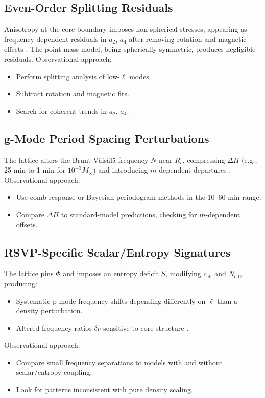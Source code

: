 \documentclass{article}
\begin{document}
\subsection{Even-Order Splitting Residuals}

Anisotropy at the core boundary imposes non-spherical stresses, appearing as frequency-dependent residuals in $a_2$, $a_4$ after removing rotation and magnetic effects \citep{lund2017}. The point-mass model, being spherically symmetric, produces negligible residuals. Observational approach:
\begin{itemize}
\item Perform splitting analysis of low-$\ell$ modes.
\item Subtract rotation and magnetic fits.
\item Search for coherent trends in $a_2$, $a_4$.
\end{itemize}

\subsection{g-Mode Period Spacing Perturbations}

The lattice alters the Brunt-Väisälä frequency $N$ near $R_c$, compressing $\Delta \Pi$ (e.g., 25 min to 1 min for $10^{-3} M_\odot$) and introducing $m$-dependent departures \citep{bellinger2025}. Observational approach:
\begin{itemize}
\item Use comb-response or Bayesian periodogram methods in the 10--60 min range.
\item Compare $\Delta \Pi$ to standard-model predictions, checking for $m$-dependent offsets.
\end{itemize}

\subsection{RSVP-Specific Scalar/Entropy Signatures}

The lattice pins $\Phi$ and imposes an entropy deficit $S$, modifying $c_{\text{eff}}$ and $N_{\text{eff}}$, producing:
\begin{itemize}
\item Systematic p-mode frequency shifts depending differently on $\ell$ than a density perturbation.
\item Altered frequency ratios $\delta \nu$ sensitive to core structure \citep{kunitomo2022}.
\end{itemize}
Observational approach:
\begin{itemize}
\item Compare small frequency separations to models with and without scalar/entropy coupling.
\item Look for patterns inconsistent with pure density scaling.
\end{itemize}
\end{document}
